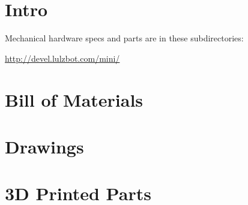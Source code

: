 %
%
%
%
%

\section{Intro}
Mechanical hardware specs and parts are in these subdirectories:

\url{http://devel.lulzbot.com/mini/}

\section{Bill of Materials}



\section{Drawings}








\section{3D Printed Parts}


